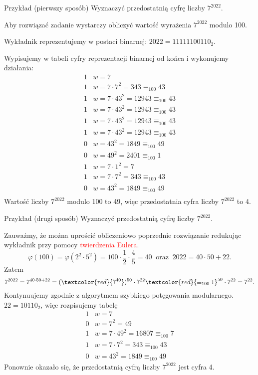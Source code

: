\documentclass[a4paper,10pt]{beamer}
\begin{document}
\begin{frame}
	
	\begin{exampleblock}{Przykład (pierwszy sposób)}
		Wyznaczyć przedostatnią cyfrę liczby $7^{2022}$.
		
		Aby rozwiązać zadanie wystarczy obliczyć wartość wyrażenia $7^{2022}$ modulo 100.
		
		Wykładnik reprezentujemy w postaci binarnej: $2022=11111100110_2$.
		
		Wypisujemy w tabeli cyfry reprezentacji binarnej od końca i wykonujemy działania:
		$$\begin{array}{l|l}
		1&w=7\\\hline
		1&w=7\cdot7^2=343\equiv_{100}43\\
		1&w=7\cdot43^2=12943\equiv_{100}43\\
		1&w=7\cdot43^2=12943\equiv_{100}43\\
		1&w=7\cdot43^2=12943\equiv_{100}43\\
		1&w=7\cdot43^2=12943\equiv_{100}43\\
		0&w=43^2=1849\equiv_{100}49\\
		0&w=49^2=2401\equiv_{100}1\\
		1&w=7\cdot1^2=7\\
		1&w=7\cdot7^2=343\equiv_{100}43\\
		0&w=43^2=1849\equiv_{100}49\\
		\end{array}$$
		Wartość liczby $7^{2022}$ modulo 100 to 49, więc przedostatnia cyfra liczby $7^{2022}$ to 4.
	\end{exampleblock}
	
\end{frame}


\begin{frame}
	
	\begin{exampleblock}{Przykład (drugi sposób)}
		Wyznaczyć przedostatnią cyfrę liczby $7^{2022}$.
		
		Zauważmy, że można uprościć obliczeniowo poprzednie rozwiązanie redukując wykładnik przy pomocy \textcolor{red}{twierdzenia Eulera}.
		$$\varphi(100)=\varphi(2^2\cdot5^2)=100\cdot\frac12\cdot\frac45=40\ \mbox{ oraz }\ 2022=40\cdot50+22.$$
		Zatem
		$$7^{2022}=7^{40\cdot50+22}=(\textcolor{red}{7^{40}})^{50}\cdot7^{22}\textcolor{red}{\equiv_{100}1}^{50}\cdot7^{22}=7^{22}.$$
		Kontynuujemy zgodnie z algorytmem szybkiego potęgowania modularnego.
		$22=10110_2$, więc rozpisujemy tabelę
		$$\begin{array}{l|l}
		1&w=7\\\hline
		0&w=7^2=49\\
		1&w=7\cdot49^2=16807\equiv_{100}7\\
		1&w=7\cdot7^2=343\equiv_{100}43\\
		0&w=43^2=1849\equiv_{100}49
		\end{array}$$
		Ponownie okazało się, że przedostatnią cyfrą liczby $7^{2022}$ jest cyfra 4.
		
	\end{exampleblock}
	
\end{frame}
\end{document}

